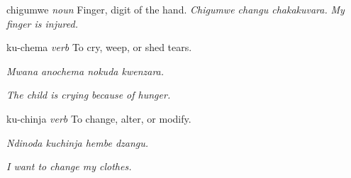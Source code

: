 \documentclass[10pt,twoside]{book}
\newcommand{\partofpeech}[1]{%
    \textit{\color{partofpeechcolor}#1}%
}
\newcommand{\example}[2]{%
    \textit{\color{examplecolor}#1} \textit{#2}%
}
\begin{document}
\begin{multicols}{2}
\raggedright
{}

\begin{dictentry}{chigumwe}
\partofpeech{noun} Finger, digit of the hand. \example{Chigumwe changu chakakuvara.}{My finger is injured.}
\end{dictentry}

\begin{dictentry}{ku-chema}
\partofpeech{verb} To cry, weep, or shed tears.

\textit{Mwana anochema nokuda kwenzara.}

\textit{The child is crying because of hunger.}
\end{dictentry}

\begin{dictentry}{ku-chinja}
\partofpeech{verb} To change, alter, or modify.

\textit{Ndinoda kuchinja hembe dzangu.}

\textit{I want to change my clothes.}
\end{dictentry}

\end{multicols}


\backmatter

\appendix
\end{document}
